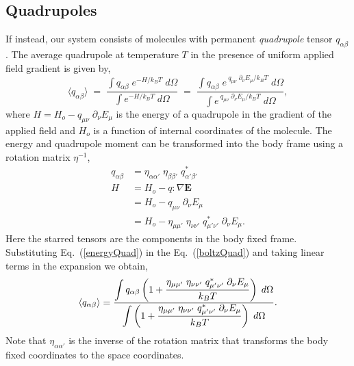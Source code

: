\subsection{Quadrupoles}
\label{subsec:boltzAverage-Quad}
If instead, our system consists of molecules with permanent
\textit{quadrupole} tensor $q_{\alpha\beta}$. The average quadrupole
at temperature $T$ in the presence of uniform applied field gradient
is given by,\cite{AduGyamfi78, AduGyamfi81}
\begin{equation}
\langle q_{\alpha\beta} \rangle \;=\; \frac{\displaystyle\int
  q_{\alpha\beta}\; e^{-H/k_B T}\; d\Omega}{\displaystyle\int
  e^{-H/k_B T}\; d\Omega} \;=\; \frac{\displaystyle\int
  q_{\alpha\beta}\; e^{~q_{\mu\nu}\;\partial_\nu E_\mu /k_B T}\;
  d\Omega}{\displaystyle\int  e^{~q_{\mu\nu}\;\partial_\nu E_\mu /k_B
    T}\; d\Omega },
\label{boltzQuad}
\end{equation}
where $H = H_o - q_{\mu\nu}\;\partial_\nu E_\mu $ is the energy of a
quadrupole in the gradient of the applied field and $H_o$ is a
function of internal coordinates of the molecule. The energy and
quadrupole moment can be transformed into the body frame using a
rotation matrix $\mathsf{\eta}^{-1}$,
\begin{align}
q_{\alpha\beta} &= \eta_{\alpha\alpha'}\;\eta_{\beta\beta'}\;{q}^* _{\alpha'\beta'} \\
H &= H_o - q:{\nabla}\mathbf{E} \\
  &= H_o - q_{\mu\nu}\;\partial_\nu E_\mu  \\
  &= H_o
    -\eta_{\mu\mu'}\;\eta_{\nu\nu'}\;{q}^*_{\mu'\nu'}\;\partial_\nu
    E_\mu. \label{energyQuad}
\end{align}
Here the starred tensors are the components in the body fixed
frame. Substituting Eq.~(\ref{energyQuad}) in the Eq.~(\ref{boltzQuad}) and taking linear terms in the expansion we obtain,
\begin{equation}
\braket{q_{\alpha\beta}} = \frac{\displaystyle \int q_{\alpha\beta} \left(1 +
    \frac{\eta_{\mu\mu'}\;\eta_{\nu\nu'}\;{q}^*_{\mu'\nu'}\;\partial_\nu
      E_\mu }{k_B T}\right)\;  d\Omega}{\displaystyle \int \left(1 + \frac{\eta_{\mu\mu'}\;\eta_{\nu\nu'}\;{q}^*_{\mu'\nu'}\;\partial_\nu E_\mu }{k_B T}\right)\; d\Omega}.
\end{equation}
Note that $\eta_{\alpha\alpha'}$ is the inverse of the rotation
matrix that transforms the body fixed coordinates to the space
coordinates.

